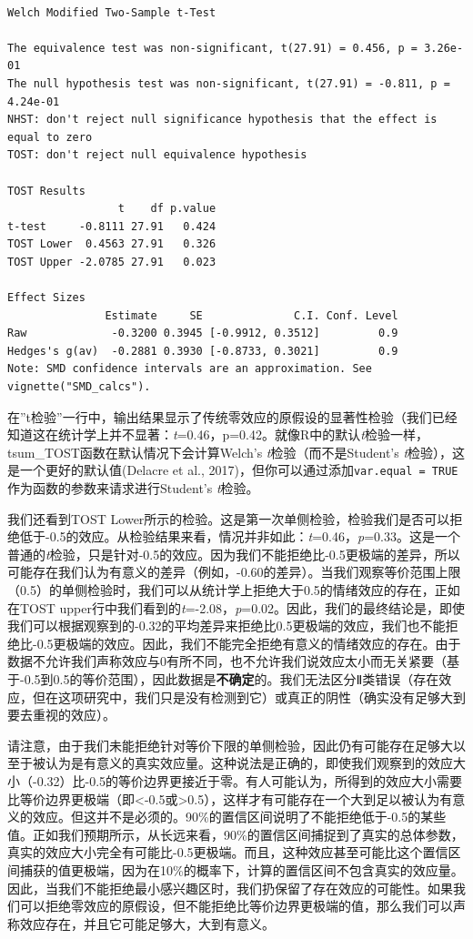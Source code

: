 \documentclass[
  letterpaper,
  DIV=11,
  numbers=noendperiod]{scrreprt}
\begin{document}
\begin{verbatim}

Welch Modified Two-Sample t-Test

The equivalence test was non-significant, t(27.91) = 0.456, p = 3.26e-01
The null hypothesis test was non-significant, t(27.91) = -0.811, p = 4.24e-01
NHST: don't reject null significance hypothesis that the effect is equal to zero 
TOST: don't reject null equivalence hypothesis

TOST Results 
                 t    df p.value
t-test     -0.8111 27.91   0.424
TOST Lower  0.4563 27.91   0.326
TOST Upper -2.0785 27.91   0.023

Effect Sizes 
               Estimate     SE              C.I. Conf. Level
Raw             -0.3200 0.3945 [-0.9912, 0.3512]         0.9
Hedges's g(av)  -0.2881 0.3930 [-0.8733, 0.3021]         0.9
Note: SMD confidence intervals are an approximation. See vignette("SMD_calcs").
\end{verbatim}

在''t检验''一行中，输出结果显示了传统零效应的原假设的显著性检验（我们已经知道这在统计学上并不显著：\emph{t}=0.46，p=0.42。就像R中的默认\emph{t}检验一样，tsum\_TOST函数在默认情况下会计算Welch's
\emph{t}检验（而不是Student's
\emph{t}检验），这是一个更好的默认值(Delacre et al.,
2017)，但你可以通过添加\texttt{var.equal\ =\ TRUE}作为函数的参数来请求进行Student's
\emph{t}检验。

我们还看到TOST
Lower所示的检验。这是第一次单侧检验，检验我们是否可以拒绝低于-0.5的效应。从检验结果来看，情况并非如此：\emph{t}=0.46，\emph{p}=0.33。这是一个普通的\emph{t}检验，只是针对-0.5的效应。因为我们不能拒绝比-0.5更极端的差异，所以可能存在我们认为有意义的差异（例如，-0.60的差异）。当我们观察等价范围上限（0.5）的单侧检验时，我们可以从统计学上拒绝大于0.5的情绪效应的存在，正如在TOST
upper行中我们看到的\emph{t}=-2.08，\emph{p}=0.02。因此，我们的最终结论是，即使我们可以根据观察到的-0.32的平均差异来拒绝比0.5更极端的效应，我们也不能拒绝比-0.5更极端的效应。因此，我们不能完全拒绝有意义的情绪效应的存在。由于数据不允许我们声称效应与0有所不同，也不允许我们说效应太小而无关紧要（基于-0.5到0.5的等价范围），因此数据是\textbf{不确定}的。我们无法区分Ⅱ类错误（存在效应，但在这项研究中，我们只是没有检测到它）或真正的阴性（确实没有足够大到要去重视的效应）。

请注意，由于我们未能拒绝针对等价下限的单侧检验，因此仍有可能存在足够大以至于被认为是有意义的真实效应量。这种说法是正确的，即使我们观察到的效应大小（-0.32）比-0.5的等价边界更接近于零。有人可能认为，所得到的效应大小需要比等价边界更极端（即\textless-0.5或\textgreater0.5），这样才有可能存在一个大到足以被认为有意义的效应。但这并不是必须的。90\%的置信区间说明了不能拒绝低于-0.5的某些值。正如我们预期所示，从长远来看，90\%的置信区间捕捉到了真实的总体参数，真实的效应大小完全有可能比-0.5更极端。而且，这种效应甚至可能比这个置信区间捕获的值更极端，因为在10\%的概率下，计算的置信区间不包含真实的效应量。因此，当我们不能拒绝最小感兴趣区时，我们扔保留了存在效应的可能性。如果我们可以拒绝零效应的原假设，但不能拒绝比等价边界更极端的值，那么我们可以声称效应存在，并且它可能足够大，大到有意义。
\end{document}
